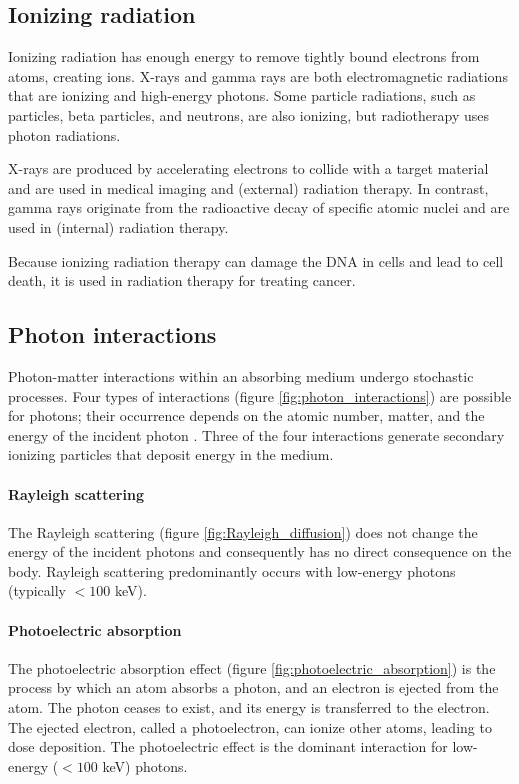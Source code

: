 \subsection{Ionizing radiation}
Ionizing radiation has enough energy to remove tightly bound electrons from atoms, creating ions.
X-rays and gamma rays are both electromagnetic radiations that are ionizing and high-energy photons.
Some particle radiations, such as particles, beta particles, and neutrons, are also ionizing, but radiotherapy uses photon radiations.

X-rays are produced by accelerating electrons to collide with a target material and are used in medical imaging and (external) radiation therapy.
In contrast, gamma rays originate from the radioactive decay of specific atomic nuclei and are used in (internal) radiation therapy. 

Because ionizing radiation therapy can damage the DNA in cells and lead to cell death, it is used in radiation therapy for treating cancer.

\subsection{Photon interactions}
Photon-matter interactions within an absorbing medium undergo stochastic processes.
Four types of interactions (figure \ref{fig:photon_interactions}) are possible for photons; their occurrence depends on the atomic number, matter, and the energy of the incident photon \cite{Evans1958}.
Three of the four interactions generate secondary ionizing particles that deposit energy in the medium.

\paragraph{Rayleigh scattering}
The Rayleigh scattering (figure \ref{fig:Rayleigh_diffusion}) does not change the energy of the incident photons and consequently has no direct consequence on the body.
Rayleigh scattering predominantly occurs with low-energy photons (typically $ < 100$ keV).

\paragraph{Photoelectric absorption}
The photoelectric absorption effect (figure \ref{fig:photoelectric_absorption}) is the process by which an atom absorbs a photon, and an electron is ejected from the atom.
The photon ceases to exist, and its energy is transferred to the electron.
The ejected electron, called a photoelectron, can ionize other atoms, leading to dose deposition.
The photoelectric effect is the dominant interaction for low-energy ($ < 100$ keV) photons.

